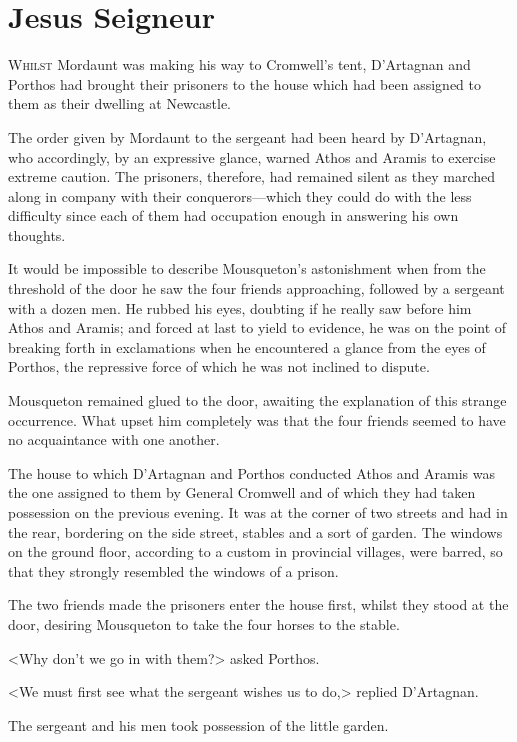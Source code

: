 \chapter{Jesus Seigneur}

 \lettrine{W}{hilst} Mordaunt was making his way to Cromwell's tent, D'Artagnan and Porthos had brought their prisoners to the house which had been assigned to them as their dwelling at Newcastle.

\zz
The order given by Mordaunt to the sergeant had been heard by D'Artagnan, who accordingly, by an expressive glance, warned Athos and Aramis to exercise extreme caution. The prisoners, therefore, had remained silent as they marched along in company with their conquerors—which they could do with the less difficulty since each of them had occupation enough in answering his own thoughts.

It would be impossible to describe Mousqueton's astonishment when from the threshold of the door he saw the four friends approaching, followed by a sergeant with a dozen men. He rubbed his eyes, doubting if he really saw before him Athos and Aramis; and forced at last to yield to evidence, he was on the point of breaking forth in exclamations when he encountered a glance from the eyes of Porthos, the repressive force of which he was not inclined to dispute.

Mousqueton remained glued to the door, awaiting the explanation of this strange occurrence. What upset him completely was that the four friends seemed to have no acquaintance with one another.

The house to which D'Artagnan and Porthos conducted Athos and Aramis was the one assigned to them by General Cromwell and of which they had taken possession on the previous evening. It was at the corner of two streets and had in the rear, bordering on the side street, stables and a sort of garden. The windows on the ground floor, according to a custom in provincial villages, were barred, so that they strongly resembled the windows of a prison.

The two friends made the prisoners enter the house first, whilst they stood at the door, desiring Mousqueton to take the four horses to the stable.

<Why don't we go in with them?> asked Porthos.

<We must first see what the sergeant wishes us to do,> replied D'Artagnan.

The sergeant and his men took possession of the little garden.

